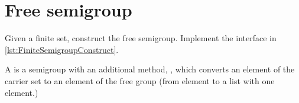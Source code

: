 \section{Free semigroup}

\begin{codeexercise}
    \label{ex:TestFiniteSemigroupConstruct}
    Given a finite set, construct the free semigroup.
    Implement the interface in \cref{lst:FiniteSemigroupConstruct}.
\end{codeexercise}


A \FreeSemigroup is a semigroup with an additional method, , which converts an element of the carrier set to an element of the free group (\eg from element to a list with one element.)

